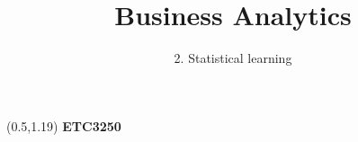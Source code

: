 \documentclass[14pt]{beamer}
\title[2. Statistical learning]{Business Analytics}
\author{2. Statistical learning}
\begin{document}
\begin{frame}[plain]{}
\maketitle
\begin{textblock}{11}(0.5,1.19){\color{white}\large
\textbf{ETC3250}}
\end{textblock}
\end{frame}
\end{document}
